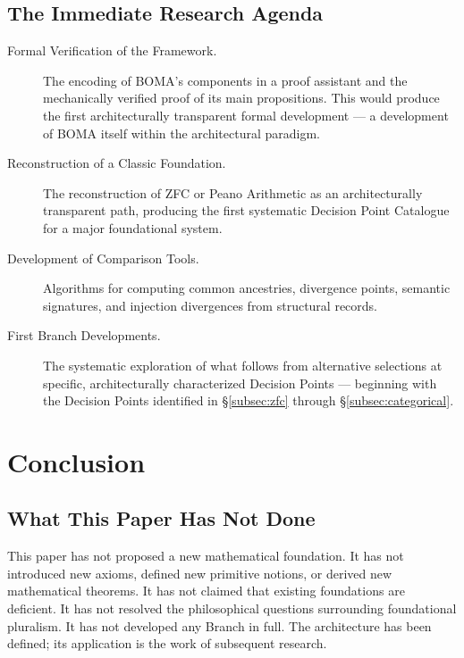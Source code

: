 \documentclass[12pt, a4paper]{article}
\theoremstyle{plain}
\theoremstyle{definition}
\theoremstyle{remark}
\newcommand{\BOMA}{\textsf{BOMA}}
\begin{document}
\subsection{The Immediate Research Agenda}
\label{subsec:agenda}

\begin{description}
  \item[Formal Verification of the Framework.]
    The encoding of \BOMA{}'s components in a proof assistant and
    the mechanically verified proof of its main propositions.
    This would produce the first architecturally transparent
    formal development --- a development of \BOMA{} itself within
    the architectural paradigm.

  \item[Reconstruction of a Classic Foundation.]
    The reconstruction of ZFC or Peano Arithmetic as an
    architecturally transparent path, producing the first
    systematic Decision Point Catalogue for a major foundational
    system.

  \item[Development of Comparison Tools.]
    Algorithms for computing common ancestries, divergence points,
    semantic signatures, and injection divergences from structural
    records.

  \item[First Branch Developments.]
    The systematic exploration of what follows from alternative
    selections at specific, architecturally characterized Decision
    Points --- beginning with the Decision Points identified in
    \S\ref{subsec:zfc} through \S\ref{subsec:categorical}.
\end{description}

\section{Conclusion}
\label{sec:conclusion}

\subsection{What This Paper Has Not Done}
\label{subsec:not-done}

This paper has not proposed a new mathematical foundation. It has not
introduced new axioms, defined new primitive notions, or derived new
mathematical theorems. It has not claimed that existing foundations are
deficient. It has not resolved the philosophical questions surrounding
foundational pluralism. It has not developed any Branch in full. The
architecture has been defined; its application is the work of
subsequent research.
\end{document}
